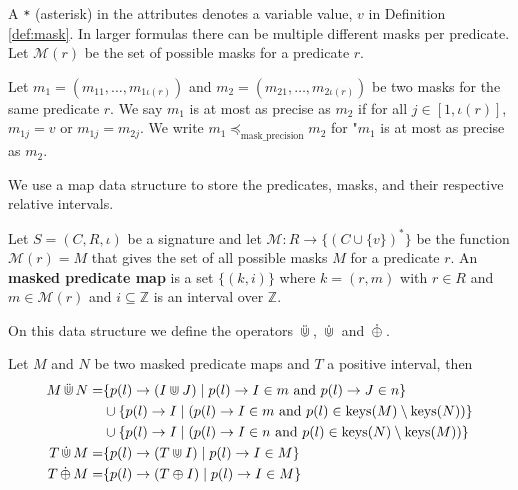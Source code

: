 A \texttt{*} (asterisk) in the attributes denotes a variable value, $v$ in Definition \ref{def:mask}.
In larger formulas there can be multiple different masks per predicate.
Let $\mathcal{M}(r)$ be the set of possible masks for a predicate $r$.

\begin{definition}
    \label{def:mask-precision-comparison}
    Let $m_1=(m_{11}, \dots, m_{1\iota(r)})$ and $m_2=(m_{21}, \dots, m_{2\iota(r)})$ be two masks for the same predicate $r$.
    We say $m_1$ is at most as precise as $m_2$ if for all $j \in [1,\iota(r)]$, $m_{1j} = v$ or $m_{1j} = m_{2j}$.
    We write $m_1 \preceq_{\text{mask\_precision}} m_2$ for "$m_1$ is at most as precise as $m_2$.
\end{definition}

We use a map data structure to store the predicates, masks, and their respective relative intervals.

\begin{definition}
    \label{def:map}
    Let $S=(C,R,\iota)$ be a signature and let $\mathcal{M} : R \to \{(C \cup \{v\})^*\}$ be the function $\mathcal{M}(r) = M$ that gives the set of all possible masks $M$ for a predicate $r$.
    An \textbf{masked predicate map} is a set $\{(k,i)\}$ where $k = (r,m)$ with $r \in R$ and $m \in \mathcal{M}(r)$ and $i \subseteq \mathbb{Z}$ is an interval over $\mathbb{Z}$. 
\end{definition}


On this data structure we define the operators $\,\ddot{\Cup}\,$, $\,\dot{\Cup}\,$ and $\,\dot{\oplus}\,$.

\begin{definition}
    \label{def:e-rel-int-ops}
    Let $M$ and $N$ be two masked predicate maps and $T$ a positive interval, then 
    \begin{align*}
        M \,\ddot{\Cup}\, N = 
            & \{ p(l) \rightarrow (I \Cup J) \mid 
                p(l) \rightarrow I \in m \text{ and } 
                p(l) \rightarrow J \in n \} \\
            & \cup \{p(l) \rightarrow I \mid  
                (p(l) \rightarrow I \in m \text{ and }
                p(l) \in \operatorname{keys}(M) \setminus \operatorname{keys}(N)) \} \\
            & \cup \{p(l) \rightarrow I \mid  
                (p(l) \rightarrow I \in n \text{ and }
                p(l) \in \operatorname{keys}(N) \setminus \operatorname{keys}(M))
                \}        
                \\
        T \,\dot{\Cup}\, M = 
            & \{ p(l) \rightarrow (T \Cup I) \mid 
                p(l) \rightarrow I \in M \} \\
        T \,\dot{\oplus}\, M = 
            & \{ p(l) \rightarrow (T \oplus I) \mid 
                p(l) \rightarrow I \in M \} \\
    \end{align*}
\end{definition}

